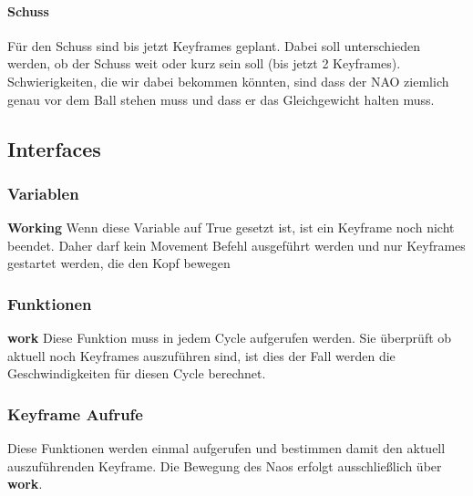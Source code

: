 \paragraph{Schuss}
Für den Schuss sind bis jetzt Keyframes geplant. Dabei soll 
unterschieden werden, ob der Schuss weit oder kurz sein soll (bis jetzt 2
 Keyframes). Schwierigkeiten, die wir dabei bekommen könnten, sind dass 
der NAO ziemlich genau vor dem Ball stehen muss und dass er das 
Gleichgewicht halten muss.

\subsection{Interfaces}
\subsubsection{Variablen}
\textbf{Working}
Wenn diese Variable auf True gesetzt ist, ist ein Keyframe noch nicht 
beendet. Daher darf kein Movement Befehl ausgeführt werden und nur 
Keyframes gestartet werden, die den Kopf bewegen

\subsubsection{Funktionen}
\textbf{work}
Diese Funktion muss in jedem Cycle aufgerufen werden. Sie überprüft ob 
aktuell noch Keyframes auszuführen sind, ist dies der Fall werden die 
Geschwindigkeiten für diesen Cycle berechnet.

\subsubsection{Keyframe Aufrufe}
Diese Funktionen werden einmal aufgerufen und bestimmen damit den 
aktuell auszuführenden Keyframe. Die Bewegung des Naos erfolgt 
ausschließlich über \textbf{work}.

